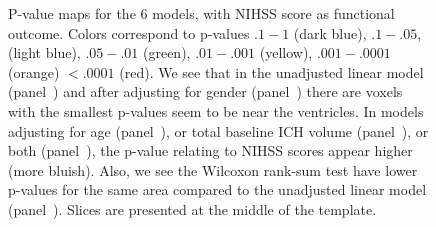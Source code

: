 \documentclass[10pt]{article}\usepackage[]{graphicx}\usepackage[]{color}
\begin{document}
\begin{figure}[htbp]
{ }
  \hfill
  \hfill
  
  \caption{P-value maps for the $6$ models, with NIHSS score as functional outcome. Colors correspond to p-values $.1-1$ (dark blue), $.1-.05$, (light blue), $.05-.01$ (green), $.01-.001$ (yellow),  $.001-.0001$ (orange) $< .0001$ (red).  We see that in the unadjusted linear model (panel~\protect{}) and after adjusting for gender (panel~\protect{}) there are voxels with the smallest p-values seem to be near the ventricles.  In models adjusting for age (panel~\protect{}), or total baseline ICH volume (panel~\protect{}), or both (panel~\protect{}), the p-value relating to NIHSS scores appear higher (more bluish).  Also, we see the Wilcoxon rank-sum test have lower p-values for the same area compared to the unadjusted linear model (panel~\protect{}). Slices are presented at the middle of the template.  }
  \label{f:mods}
\end{figure}
\end{document}
